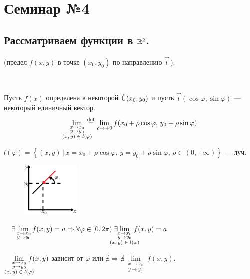 \newcommand{\coursename}{Математический анализ 1 к. 2 с.}
\newcommand{\compiledby}{} %
\newcommand{\coursedate}{Весна 2018 г.}



\section{Семинар №4}

\subsection{Рассматриваем функции в $\R^2$.}

\Def (предел $f(x,y)$ в точке $(x_0, y_0)$ по направлению $\vec l \,$).

~~\parbox[t]{0.95\linewidth} {
Пусть $f(x)$ определена в некоторой $\Uo(x_0, y_0)$ и пусть $\vec l (\cos\varphi, \sin\varphi)$ --- некоторый единичный вектор.
$$\lim\limits_{\substack {x \to x_0 \\ y \to y_0 \\ \normalsize \text{$(x,y)  \in  l(\varphi)$}}} \! \! \! \! \! \! \eqdef \lim\limits_{\rho \to +0} f(x_0 + \rho\cos\varphi,\, y_0 + \rho\sin\varphi) $$
}

\Note $l(\varphi) = \left\{ (x,y) \, | \, x=x_0 + \rho\cos\varphi,\, y=y_0 + \rho\sin\varphi, \, \rho \in (0, +\infty) \right\}$ --- луч.

\begin{figure}[h]
	\begin{center}
	    \includegraphics[width=0.25\textwidth]{1.png}
	  \end{center}
	\caption{}
\end{figure}


~~$\exists \lim\limits_{\substack {x \to x_0 \\ y \to y_0}} f(x,y) = a \Rightarrow \forall \varphi \in [0, 2\pi) \; \exists \! \! \! \! \! \! \! \! \lim\limits_{\substack {x \to x_0 \\ y \to y_0 \\ \normalsize \text{$(x,y)  \in  l(\varphi)$}}} \! \! \! \! \! \! f(x,y) = a$

\Consequence{} $\lim\limits_{\substack {x \to x_0 \\ y \to y_0 \\ \normalsize \text{$(x,y)  \in  l(\varphi)$}}} \! \! \! \! \! \! f(x,y)$ зависит от $\varphi$ или $\nexists \Rightarrow \nexists \lim\limits_{\substack {x \to x_0 \\ y \to y_0}} f(x,y)$.




